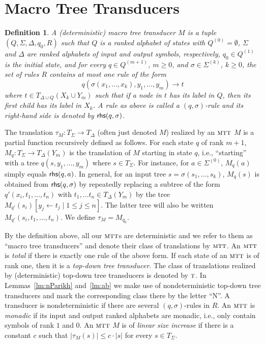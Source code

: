 \documentclass[copyright,creativecommons]{eptcs}
\newtheorem{definition}{Definition}
\newcommand{\ttt}{\textsc{t}}
\newcommand{\mtt}{\textsc{mtt}}
\def\rhs{{\sf rhs}}
\begin{document}
\section{Macro Tree Transducers}

\begin{definition}\rm
A \emph{(deterministic) macro tree transducer} $M$ is a tuple $(Q,\Sigma,\Delta,q_0,R)$
such that $Q$ is a ranked alphabet of states with $Q^{(0)}=\emptyset$, 
$\Sigma$ and $\Delta$ are ranked alphabets of input and output
symbols, respectively, $q_0\in Q^{(1)}$ is the initial state, and
for every $q\in Q^{(m+1)}$, $m\geq 0$, and $\sigma\in\Sigma^{(k)}$, $k\geq 0$, 
the set of rules $R$ contains at most one rule of the form
\[
q(\sigma(x_1,\dots,x_k),y_1,\dots,y_m)\to t
\]
where $t\in T_{\Delta\cup Q}(X_k\cup Y_m)$ such that
if a node in $t$ has its label in $Q$, then its first child has 
its label in $X_k$. A rule as above is called a $(q,\sigma)$-rule and 
its right-hand side is denoted by $\rhs(q,\sigma)$.
\end{definition}

The translation $\tau_M: T_\Sigma\to T_\Delta$ (often just denoted $M$)
realized by an $\mtt$ $M$ is a partial function recursively defined as follows.
For each state $q$ of rank $m+1$, $M_q: T_\Sigma\to T_\Delta(Y_m)$
is the translation of $M$ starting in state $q$, i.e.,
``starting'' with a tree $q(s,y_1,\dots,y_m)$ where $s\in T_\Sigma$.
For instance, for $a\in\Sigma^{(0)}$, $M_q(a)$ simply
equals $\rhs(q,a)$.
In general, for an input tree $s=\sigma(s_1,\dots,s_k)$,
$M_q(s)$ is obtained from $\rhs(q,\sigma)$ by repeatedly replacing
a subtree of the form $q'(x_i,t_1,\dots,t_n)$ 
with $t_1,\dots t_n\in T_\Delta(Y_m)$
by
the tree $M_{q'}(s_i)[y_j\leftarrow t_j\mid 1\leq j\leq n]$.
The latter tree will also be written 
$M_{q'}(s_i,t_1,\dots,t_n)$.
We define $\tau_M=M_{q_0}$.

By the definition above, all our $\mtt$s are deterministic 
and we refer to them as ``macro tree transducers'' and
denote their class of translations by $\mtt$.
An $\mtt$ is \emph{total} if there is exactly one rule of the above form. 
If each state of an $\mtt$ is of rank one, 
then it is a \emph{top-down tree transducer}.
The class of translations realized by (deterministic) 
top-down tree transducers is denoted by $\ttt$.
In Lemmas~\ref{lm:nParikh} and~\ref{lm:ab} we 
make use of nondeterministic top-down tree transducers
and mark the corresponding class there by the letter ``N''.
A transducer is nondeterministic if there are several 
$(q,\sigma)$-rules in $R$. An $\mtt$ is \emph{monadic} if its
input and output ranked alphabets are monadic, i.e., only contain
symbols of rank $1$ and $0$.
An $\mtt$ $M$ is of \emph{linear size increase} if there is a constant $c$ 
such that $|\tau_M(s)|\leq c\cdot |s|$ for every $s\in T_\Sigma$. 
\end{document}

